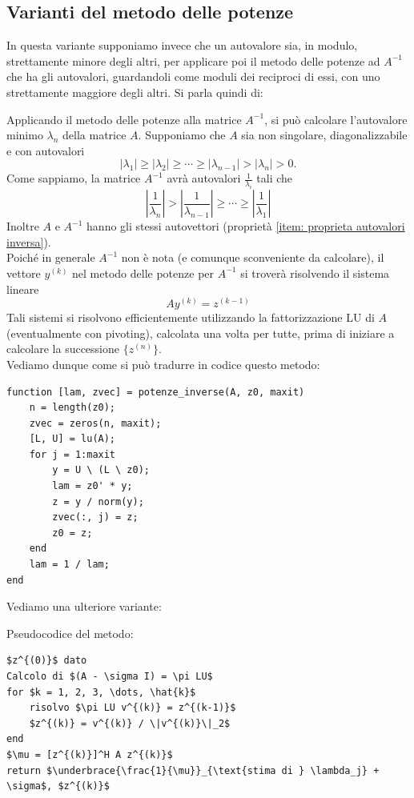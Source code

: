 \documentclass[12pt,a4paper,]{report}
\begin{document}
\subsection{Varianti del metodo delle potenze}
In questa variante supponiamo invece che un autovalore sia, in modulo, strettamente minore degli altri, per applicare poi il metodo delle potenze ad $A^{-1}$ che ha gli autovalori, guardandoli come moduli dei reciproci di essi, con uno strettamente maggiore degli altri.
Si parla quindi di:
\begin{metodo}
    Applicando il metodo delle potenze alla matrice $A^{-1}$,
    si pu\`o calcolare l'autovalore minimo $\lambda_n$ della matrice $A$.
    Supponiamo che $A$ sia non singolare, diagonalizzabile e con autovalori
    \[
    |\lambda_1| \ge |\lambda_2| \ge \cdots \ge |\lambda_{n-1}| > |\lambda_n| > 0.
    \]
    Come sappiamo, la matrice $A^{-1}$ avr\`a autovalori $\frac{1}{\lambda_i}$
    tali che
    \[
    \left| \frac{1}{\lambda_n} \right|
    >
    \left| \frac{1}{\lambda_{n-1}} \right|
    \ge \cdots \ge
    \left| \frac{1}{\lambda_1} \right|
    \]
    Inoltre $A$ e $A^{-1}$ hanno gli stessi autovettori (proprietà \ref{item: proprieta autovalori inversa}).\\
    Poich\'e in generale $A^{-1}$ non \`e nota
    (e comunque sconveniente da calcolare),
    il vettore $y^{(k)}$ nel metodo delle potenze per $A^{-1}$
    si trover\`a risolvendo il sistema lineare
    \[
    A y^{(k)} = z^{(k-1)}
    \]
    Tali sistemi si risolvono efficientemente utilizzando la fattorizzazione
    LU di $A$ (eventualmente con pivoting),
    calcolata una volta per tutte,
    prima di iniziare a calcolare la successione $\{z^{(n)}\}$.\\
    Vediamo dunque come si può tradurre in codice questo metodo:
    \begin{lstlisting}
function [lam, zvec] = potenze_inverse(A, z0, maxit)
    n = length(z0);
    zvec = zeros(n, maxit);
    [L, U] = lu(A);
    for j = 1:maxit
        y = U \ (L \ z0);
        lam = z0' * y;
        z = y / norm(y);
        zvec(:, j) = z;
        z0 = z;
    end
    lam = 1 / lam;
end
    \end{lstlisting}
\end{metodo}

\noindent
Vediamo una ulteriore variante:
\begin{metodo}
Pseudocodice del metodo:
    \begin{lstlisting}[mathescape=true]
$z^{(0)}$ dato
Calcolo di $(A - \sigma I) = \pi LU$
for $k = 1, 2, 3, \dots, \hat{k}$
    risolvo $\pi LU v^{(k)} = z^{(k-1)}$
    $z^{(k)} = v^{(k)} / \|v^{(k)}\|_2$
end
$\mu = [z^{(k)}]^H A z^{(k)}$
return $\underbrace{\frac{1}{\mu}}_{\text{stima di } \lambda_j} + \sigma$, $z^{(k)}$
    \end{lstlisting}
\end{metodo}
    
\end{document}
